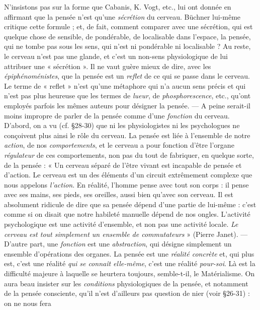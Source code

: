 \vspace{0.24cm}
{\footnotesize N'insistons pas sur la forme que Cabanis, K. Vogt, etc., lui ont donnée
en affirmant que la pensée n’est qu’une {\textit{\textsf{sécrétion}}} du cerveau. Büchner
lui-même critique cette formule ; et, de fait, comment comparer avec une
sécrétion, qui est quelque chose de sensible, de pondérable, de localisable
dans l’espace, la pensée, qui ne tombe pas sous les sens, qui n’est ni pondérable
ni localisable ? Au reste, le cerveau n’est pas une glande, et c’est un
non-sens physiologique de lui attribuer une « sécrétion ». Il ne vaut guère
mieux de dire, avec les {\it épiphénoménistes}, que la pensée est un {\textit{\textsf{reflet}}} de ce
qui se passe dans le cerveau. Le terme de « reflet » n’est qu’une métaphore
qui n’a aucun sens précis et qui n’est pas plus heureuse que les termes de
{\it lueur}, de {\it phosphorescence}, etc., qu'ont employés parfois les mêmes auteurs
pour désigner la pensée. — A peine serait-il moins impropre de parler de
la pensée comme d’une \textsf{\textit {fonction}} du cerveau. D'abord, on a vu (cf. \S 28-30) que
ni les physiologistes ni les psychologues ne conçoivent plus ainsi le rôle du
cerveau. La pensée est liée à l’ensemble de notre {\it action}, de nos {\it comportements},
et le cerveau a pour fonction d’être l'organe {\it régulateur} de ces comportements,
non pas du tout de fabriquer, en quelque sorte, de la pensée : « Un
cerveau séparé de l’être vivant est incapable de pensée et d'action. Le cerveau
est un des éléments d’un circuit extrêmement complexe que nous appelons
{\it l’action}. En réalité, l'homme pense avec tout son corps : il pense avec ses
mains, ses pieds, ses oreilles, aussi bien qu’avec son cerveau. Il est absolument
ridicule de dire que sa pensée dépend d’une partie de lui-même : c'est
comme si on disait que notre habileté manuelle dépend de nos ongles.
L'activité psychologique est une activité d'ensemble, et non pas une
activité locale. {\it Le cerveau est tout simplement un ensemble de commutateurs} »
(Pierre Janet). — D'autre part, une {\it fonction} est une \textsf{\textit {abstraction}}, qui désigne
simplement un ensemble d'opérations des organes. La pensée est une
{\it réalité concrète} et, qui plus est, c’est une réalité {\it qui se connaît elle-même},
c’est une réalité {\it pour-soi}. Là est la difficulté majeure à laquelle se heurtera
toujours, semble-t-il, le Matérialisme. On aura beau insister sur les {\it conditions}
physiologiques de la pensée, et notamment de la pensée consciente,
qu’il n’est d’ailleurs pas question de nier (voir \S 26-31) : on ne nous fera
}
